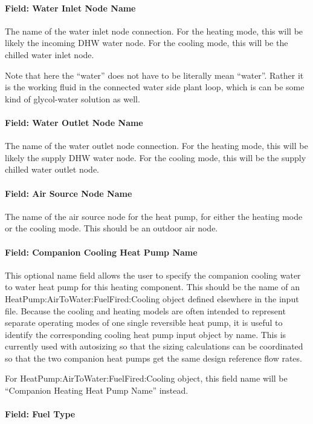 \paragraph{Field: Water Inlet Node Name}

The name of the water inlet node connection. For the heating mode, this will be likely the incoming DHW water node. For the cooling mode, this will be the chilled water inlet node.

Note that here the ``water'' does not have to be literally mean ``water''. Rather it is the working fluid in the connected water side plant loop, which is can be some kind of glycol-water solution as well. 

\paragraph{Field: Water Outlet Node Name}
The name of the water outlet node connection. For the heating mode, this will be likely the supply DHW water node. For the cooling mode, this will be the supply chilled water outlet node.

\paragraph{Field: Air Source Node Name}
The name of the air source node for the heat pump, for either the heating mode or the cooling mode. This should be an outdoor air node.

\paragraph{Field: Companion Cooling Heat Pump Name}

This optional name field allows the user to specify the companion cooling water to water heat pump for this heating component. This should be the name of an HeatPump:AirToWater:FuelFired:Cooling object defined elsewhere in the input file. Because the cooling and heating models are often intended to represent separate operating modes of one single reversible heat pump, it is useful to identify the corresponding cooling heat pump input object by name. This is currently used with autosizing so that the sizing calculations can be coordinated so that the two companion heat pumps get the same design reference flow rates.

For HeatPump:AirToWater:FuelFired:Cooling object, this field name will be ``Companion Heating Heat Pump Name'' instead.

\paragraph{Field: Fuel Type}

